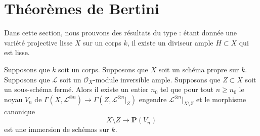 \section{Théorèmes de Bertini}
\label{section-bertini}

\noindent
Dans cette section, nous prouvons des résultats du type :
étant donnée une variété projective lisse $X$ sur un corps
$k$, il existe un diviseur ample $H \subset X$ qui est lisse.

\begin{lemma}
\label{lemma-generate-over-complement}
Supposons que $k$ soit un corps. Supposons que $X$ soit un
schéma propre sur $k$. Supposons que $\mathcal{L}$ soit un
$\mathcal{O}_X$-module inversible ample. Supposons que $Z \subset
X$ soit un sous-schéma fermé. Alors il existe un entier $n_0$ tel
que pour tout $n \geq n_0$ le noyau $V_n$ de $\Gamma(X,
\mathcal{L}^{\otimes n}) \to \Gamma(Z, \mathcal{L}^{\otimes n}|_Z)$
engendre $\mathcal{L}^{\otimes n}|_{X \setminus Z}$ et le morphisme canonique
$$
X \setminus Z \longrightarrow \mathbf{P}(V_n)
$$
est une immersion de schémas sur $k$.
\end{lemma}

